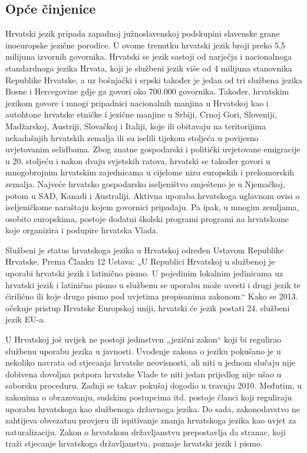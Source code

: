 \begin{multicols}{2}

\subsection{Opće činjenice}

Hrvatski jezik pripada zapadnoj južnoslavenskoj podskupini slavenske grane inoeuropske jezične porodice. U ovome trenutku hrvatski jezik broji preko 5,5 milijuna izvornih govornika. Hrvatski se jezik sastoji od narječja i nacionalnoga standardnoga jezika Hrvata, koji je službeni jezik više od 4 milijuna stanovnika Republike Hrvatske, a uz bošnjački i srpski također je jedan od tri službena jezika Bosne i Hercegovine gdje ga govori oko 700.000 govornika. Također, hrvatskim jezikom govore i mnogi pripadnici nacionalnih manjina u Hrvatskoj kao i autohtone hrvatske etničke i jezične manjine u Srbiji, Crnoj Gori, Sloveniji, Madžarskoj, Austriji, Slovačkoj i Italiji, koje ili obitavaju na teritorijima nekadašnjih hrvatskih zemalja ili su iselili tijekom stoljeća u povijesno uvjetovanim selidbama. Zbog znatne gospodarski i politički uvjetovane emigracije u 20. stoljeću i nakon dvaju svjetskih ratova, hrvatski se također govori u mnogobrojnim hrvatskim zajednicama u cijelome nizu europskih i prekomorskih zemalja. Najveće hrvatsko gospodarsko iseljeništvo smješteno je u Njemačkoj, potom u SAD, Kanadi i Australiji. Aktivna uporaba hrvatskoga uglavnom ovisi o iseljeničkome naraštaju kojem govornici pripadaju. Pa ipak, u mnogim zemljama, osobito europskima, postoje dodatni školski programi programi na hrvatskome koje organizira i podupire hrvatska Vlada.

Službeni je status hrvatskoga jezika u Hrvatskoj određen Ustavom Republike Hrvatske. Prema Članku 12 Ustava: „U Republici Hrvatskoj u službenoj je uporabi hrvatski jezik i latinično pismo. U pojedinim lokalnim jedinicama uz hrvatski jezik i latinično pismo u službenu se uporabu može uvesti i drugi jezik te ćirilićno ili koje drugo pismo pod uvjetima propisanima zakonom.“ Kako se 2013. očekuje pristup Hrvatske Europskoj uniji, hrvatski će jezik postati 24. službeni jezik EU-a.


U Hrvatskoj još uvijek ne postoji jedinstven „jezični zakon“ koji bi regulirao službenu uporabu jezika u javnosti. Uvođenje zakona o jeziku pokušano je u nekoliko navrata od stjecanja hrvatske neovisnosti, ali niti u jednom slučaju nije dobivena dovoljna potpora hrvatske Vlade te niti jedan prijedlog nije ušao u saborsku proceduru. Zadnji se takav pokušaj dogodio u travnju 2010. Međutim, u zakonima o obrazovanju, sudskim postupcima itd. postoje članci koji reguliraju uporabu hrvatskoga kao službenoga državnoga jezika. Do sada, zakonodavstvo ne zahtijeva obvezatnu provjeru ili ispitivanje znanja hrvatskoga jezika kao uvjet za naturalizaciju. Zakon o hrvatskom državljanstvu \cite{str6} prepostavlja da stranac, koji traži stjecanje hrvatskoga državljanstva, poznaje hrvatski jezik i pismo.


\end{multicols}
